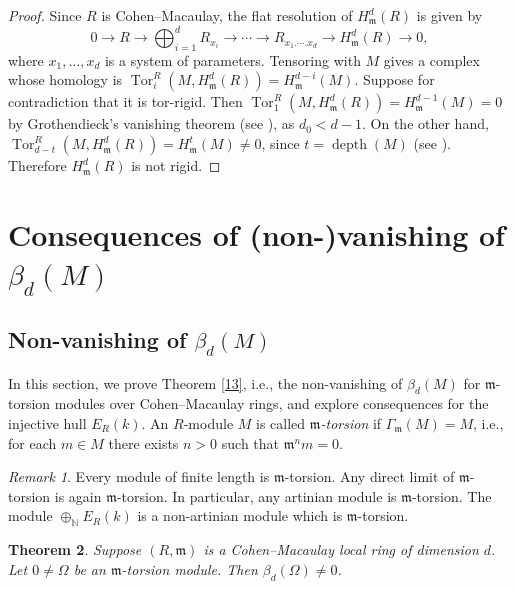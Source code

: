 \documentclass[11pt,a4paper]{amsart}
\numberwithin{equation}{section}
\newtheorem{theorem}{Theorem}[section]
\theoremstyle{definition}
\theoremstyle{remark}
\newtheorem{remark}[theorem]{Remark}
\begin{document}
\begin{proof}
Since \(R\) is Cohen--Macaulay, the flat resolution of \(H^d_{\mathfrak{m}}(R)\) is given by
\[0 \longrightarrow R \longrightarrow\bigoplus_{i=1}^d R_{x_i} \longrightarrow \cdots \longrightarrow R_{x_1.   \cdots . x_d} \longrightarrow H^d_{\mathfrak{m}}(R) \longrightarrow 0,
	\]
where \(x_1,\ldots,x_d\) is a system of parameters. Tensoring with \(M\) gives a complex whose homology is
$\operatorname{Tor}^{R}_{i}(M,H^{d}_{\mathfrak{m}}(R))=H^{d-i}_{\mathfrak{m}}(M).$
Suppose for contradiction that it is tor-rigid. Then \(\operatorname{Tor}^{R}_{1}(M,H^d_{\mathfrak{m}}(R))=H^{d-1}_{\mathfrak{m}}(M)=0\) by Grothendieck's vanishing theorem (see \cite[6.1.2]{BSh}), as \(d_0<d-1\). On the other hand, \(\operatorname{Tor}^{R}_{d-t}(M,H^d_{\mathfrak{m}}(R))=H^{t}_{\mathfrak{m}}(M)\neq 0\), since \(t=\operatorname{depth}(M)\) (see \cite[6.2.7]{BSh}). Therefore \(H^d_{\mathfrak{m}}(R)\) is not rigid.
\end{proof}

\section{Consequences of (non-)vanishing of \(\beta_d(M)\)}	
\subsection{Non-vanishing of \(\beta_d(M)\)}
	
In this section, we prove {Theorem} \ref{13}, i.e., the non-vanishing of \(\beta_d(M)\) for \(\mathfrak{m}\)-torsion modules over Cohen--Macaulay rings, and explore consequences for the injective hull \(E_R(k)\).
An \(R\)-module \(M\) is called \emph{\(\mathfrak{m}\)-torsion} if \(\Gamma_{\mathfrak{m}}(M)=M\), i.e., for each \(m\in M\) there exists \(n>0\) such that \(\mathfrak{m}^n m =0\). 


\begin{remark}
Every module of finite length is \(\mathfrak{m}\)-torsion. Any direct limit of  {\(\mathfrak{m}\)-torsion} is again  {\(\mathfrak{m}\)-torsion}. In particular,
any artinian module is  {\(\mathfrak{m}\)-torsion}.
	The module $\oplus_{\mathbb{N}}E_R(k)$ is a non-artinian module which is  {\(\mathfrak{m}\)-torsion}. 
\end{remark}
	
\begin{theorem}\label{thm:top-betti}
Suppose \((R,\mathfrak{m})\) is a Cohen--Macaulay local ring of dimension \(d\). Let \(0\neq\Omega\) be an \(\mathfrak{m}\)-torsion module. Then \(\beta_d(\Omega)\neq 0\).
\end{theorem}
\end{document}
